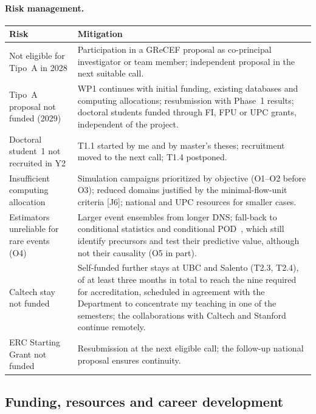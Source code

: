 \documentclass[11pt]{article}
\begin{document}
\paragraph{Risk management.}
\begin{center}\small
\begin{tabularx}{\textwidth}{@{}>{\raggedright\arraybackslash}p{4.4cm}X@{}}
\toprule
\textbf{Risk} & \textbf{Mitigation} \\
\midrule
Not eligible for Tipo~A in 2028 & Participation in a GReCEF proposal as co-principal investigator or team member; independent proposal in the next suitable call. \\
Tipo~A proposal not funded (2029) & WP1 continues with initial funding, existing databases and computing allocations; resubmission with Phase~1 results; doctoral students funded through FI, FPU or UPC grants, independent of the project. \\
Doctoral student~1 not recruited in Y2 & T1.1 started by me and by master's theses; recruitment moved to the next call; T1.4 postponed. \\
Insufficient computing allocation & Simulation campaigns prioritized by objective (O1--O2 before O3); reduced domains justified by the minimal-flow-unit criteria [J6]; national and UPC resources for smaller cases. \\
Estimators unreliable for rare events (O4) & Larger event ensembles from longer DNS; fall-back to conditional statistics and conditional POD~\cite{Martin2025}, which still identify precursors and test their predictive value, although not their causality (O5 in part). \\
Caltech stay not funded & Self-funded further stays at UBC and Salento (T2.3, T2.4), of at least three months in total to reach the nine required for accreditation, scheduled in agreement with the Department to concentrate my teaching in one of the semesters; the collaborations with Caltech and Stanford continue remotely. \\
ERC Starting Grant not funded & Resubmission at the next eligible call; the follow-up national proposal ensures continuity. \\
\bottomrule
\end{tabularx}
\end{center}

\subsection{Funding, resources and career development}\label{sec:resources}
\end{document}
